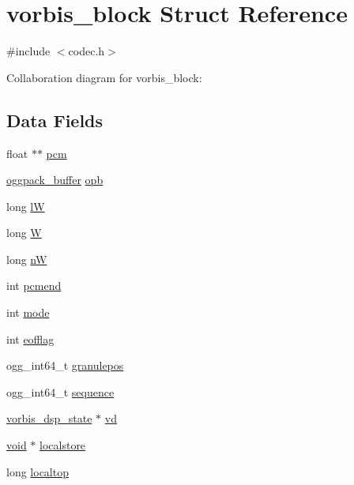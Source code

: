 \hypertarget{structvorbis__block}{}\section{vorbis\+\_\+block Struct Reference}
\label{structvorbis__block}


{\ttfamily \#include $<$codec.\+h$>$}



Collaboration diagram for vorbis\+\_\+block\+:
\subsection*{Data Fields}
\begin{DoxyCompactItemize}
\item 
float $\ast$$\ast$ \hyperlink{structvorbis__block_ac8312d70a6e63afc01d3df8a54ac6508}{pcm}
\item 
\hyperlink{structoggpack__buffer}{oggpack\+\_\+buffer} \hyperlink{structvorbis__block_a43f1746974a729fa4e835ef995f9782a}{opb}
\item 
long \hyperlink{structvorbis__block_a97675088561ed9aa4559e869aafd1f2c}{lW}
\item 
long \hyperlink{structvorbis__block_a1e420440dd6a5a39262c0fe7afa8435a}{W}
\item 
long \hyperlink{structvorbis__block_a6fa002c8c36ad39c1c015cfa673dda28}{nW}
\item 
int \hyperlink{structvorbis__block_a946562a7fdb80cabf6ee749bdce1a0ed}{pcmend}
\item 
int \hyperlink{structvorbis__block_adab44bb8520c9d5daafee3f1a1bcf538}{mode}
\item 
int \hyperlink{structvorbis__block_a7bc1252bc17a2cd1ee2a4154fdd2617b}{eofflag}
\item 
ogg\+\_\+int64\+\_\+t \hyperlink{structvorbis__block_a3dc7d5e474ae80ea641df91eba16b490}{granulepos}
\item 
ogg\+\_\+int64\+\_\+t \hyperlink{structvorbis__block_a09e48c70ae79cae2d37a4e0e55f294ef}{sequence}
\item 
\hyperlink{structvorbis__dsp__state}{vorbis\+\_\+dsp\+\_\+state} $\ast$ \hyperlink{structvorbis__block_adefe79be61ef3631c18cd7b8afae31a2}{vd}
\item 
\hyperlink{png_8h_ac9c84fa68bbad002983e35ce3663c686}{void} $\ast$ \hyperlink{structvorbis__block_a457093b574de4317ae1b2505a868a5fb}{localstore}
\item 
long \hyperlink{structvorbis__block_a5d207139360d9fa6c825ebca553ae984}{localtop}
$$
\end{DoxyCompactItemize}
